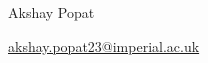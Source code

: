 \documentclass[10pt, letterpaper]{article}
\newenvironment{highlightsforbulletentries}{
    \begin{itemize}[
        topsep=0.10 cm,
        parsep=0.10 cm,
        partopsep=0pt,
        itemsep=0pt,
        leftmargin=10pt
    ]
}{
    \end{itemize}
}
\newenvironment{onecolentry}{
    \begin{adjustwidth}{
        0 cm + 0.00001 cm
    }{
        0 cm + 0.00001 cm
    }
}{
    \end{adjustwidth}
}
\newenvironment{header}{
    \setlength{\topsep}{0pt}\par\kern\topsep\centering\linespread{1.5}
}{
    \par\kern\topsep
}
\let\hrefWithoutArrow\href
\begin{document}
    \newcommand{\AND}{\unskip
        \cleaders\copy\ANDbox\hskip\wd\ANDbox
        \ignorespaces
    }
    \newsavebox\ANDbox
    \sbox\ANDbox{$|$}

    \begin{header}
        \fontsize{25 pt}{25 pt}\selectfont Akshay Popat

        \vspace{5 pt}

        \normalsize

        \mbox{\hrefWithoutArrow{mailto:akshay.popat23@imperial.ac.uk}{akshay.popat23@imperial.ac.uk}}%

    \end{header}

    \vspace{5 pt - 0.3 cm}














\end{document}
